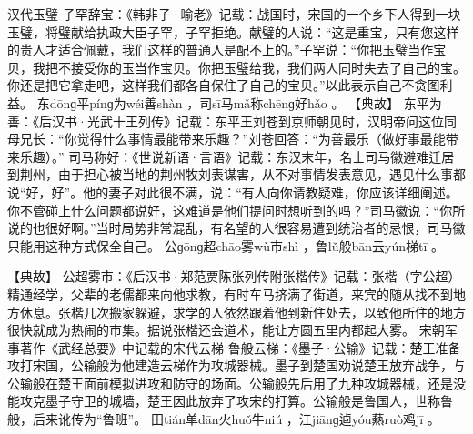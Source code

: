 \documentclass[12pt,UTF8]{ctexbook}
\begin{document}
汉代玉璧
子罕辞宝：《韩非子·喻老》记载：战国时，宋国的一个乡下人得到一块玉璧，将璧献给执政大臣子罕，子罕拒绝。献璧的人说：“这是重宝，只有您这样的贵人才适合佩戴，我们这样的普通人是配不上的。”子罕说：“你把玉璧当作宝贝，我把不接受你的玉当作宝贝。你把玉璧给我，我们两人同时失去了自己的宝。你还是把它拿走吧，这样我们都各自保住了自己的宝贝。”以此表示自己不贪图利益。
东dōnɡ平pínɡ为wéi善shàn
，司sī马mǎ称chēnɡ好hǎo
。
【典故】
东平为善：《后汉书·光武十王列传》记载：东平王刘苍到京师朝见时，汉明帝问这位同母兄长：“你觉得什么事情最能带来乐趣？”刘苍回答：“为善最乐（做好事最能带来乐趣）。”
司马称好：《世说新语·言语》记载：东汉末年，名士司马徽避难迁居到荆州，由于担心被当地的荆州牧刘表谋害，从不对事情发表意见，遇见什么事都说“好，好”。他的妻子对此很不满，说：“有人向你请教疑难，你应该详细阐述。你不管碰上什么问题都说好，这难道是他们提问时想听到的吗？”司马徽说：“你所说的也很好啊。”当时局势非常混乱，有名望的人很容易遭到统治者的忌恨，司马徽只能用这种方式保全自己。
公ɡōnɡ超chāo雾wù市shì
，鲁lǔ般bān云yún梯tī
。

【典故】
公超雾市：《后汉书·郑范贾陈张列传附张楷传》记载：张楷（字公超）精通经学，父辈的老儒都来向他求教，有时车马挤满了街道，来宾的随从找不到地方休息。张楷几次搬家躲避，求学的人依然跟着他到新住处去，以致他所住的地方很快就成为热闹的市集。据说张楷还会道术，能让方圆五里内都起大雾。
宋朝军事著作《武经总要》中记载的宋代云梯
鲁般云梯：《墨子·公输》记载：楚王准备攻打宋国，公输般为他建造云梯作为攻城器械。墨子到楚国劝说楚王放弃战争，与公输般在楚王面前模拟进攻和防守的场面。公输般先后用了九种攻城器械，还是没能攻克墨子守卫的城墙，楚王因此放弃了攻宋的打算。公输般是鲁国人，世称鲁般，后来讹传为“鲁班”。
田tián单dān火huǒ牛niú
，江jiānɡ逌yóu爇ruò鸡jī
。
\end{document}
